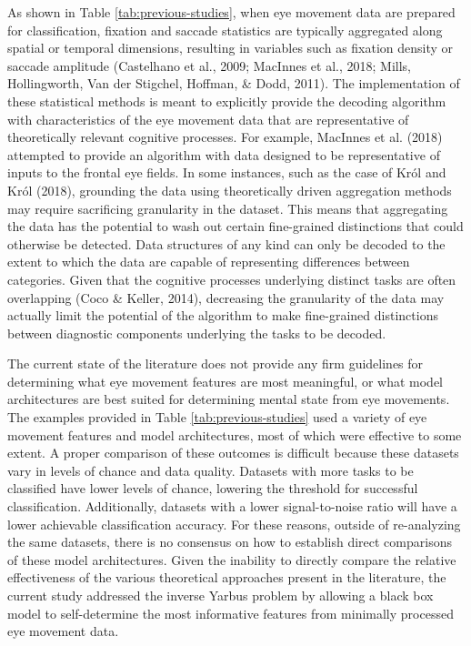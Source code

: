 \documentclass[
  english,
  man, donotrepeattitle,floatsintext]{apa6}
\begin{document}
As shown in Table \ref{tab:previous-studies}, when eye movement data are prepared for classification, fixation and saccade statistics are typically aggregated along spatial or temporal dimensions, resulting in variables such as fixation density or saccade amplitude (Castelhano et al., 2009; MacInnes et al., 2018; Mills, Hollingworth, Van der Stigchel, Hoffman, \& Dodd, 2011). The implementation of these statistical methods is meant to explicitly provide the decoding algorithm with characteristics of the eye movement data that are representative of theoretically relevant cognitive processes. For example, MacInnes et al. (2018) attempted to provide an algorithm with data designed to be representative of inputs to the frontal eye fields. In some instances, such as the case of Król and Król (2018), grounding the data using theoretically driven aggregation methods may require sacrificing granularity in the dataset. This means that aggregating the data has the potential to wash out certain fine-grained distinctions that could otherwise be detected. Data structures of any kind can only be decoded to the extent to which the data are capable of representing differences between categories. Given that the cognitive processes underlying distinct tasks are often overlapping (Coco \& Keller, 2014), decreasing the granularity of the data may actually limit the potential of the algorithm to make fine-grained distinctions between diagnostic components underlying the tasks to be decoded.

The current state of the literature does not provide any firm guidelines for determining what eye movement features are most meaningful, or what model architectures are best suited for determining mental state from eye movements. The examples provided in Table \ref{tab:previous-studies} used a variety of eye movement features and model architectures, most of which were effective to some extent. A proper comparison of these outcomes is difficult because these datasets vary in levels of chance and data quality. Datasets with more tasks to be classified have lower levels of chance, lowering the threshold for successful classification. Additionally, datasets with a lower signal-to-noise ratio will have a lower achievable classification accuracy. For these reasons, outside of re-analyzing the same datasets, there is no consensus on how to establish direct comparisons of these model architectures. Given the inability to directly compare the relative effectiveness of the various theoretical approaches present in the literature, the current study addressed the inverse Yarbus problem by allowing a black box model to self-determine the most informative features from minimally processed eye movement data.
\end{document}
